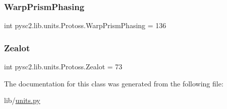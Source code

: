 \subsubsection{\texorpdfstring{Warp\+Prism\+Phasing}{WarpPrismPhasing}}
{\footnotesize\ttfamily int pysc2.\+lib.\+units.\+Protoss.\+Warp\+Prism\+Phasing = 136\hspace{0.3cm}{\ttfamily [static]}}

\mbox{\label{classpysc2_1_1lib_1_1units_1_1_protoss_a4c808c05c5d50f5057a6243f483c724e}} 
\subsubsection{\texorpdfstring{Zealot}{Zealot}}
{\footnotesize\ttfamily int pysc2.\+lib.\+units.\+Protoss.\+Zealot = 73\hspace{0.3cm}{\ttfamily [static]}}



The documentation for this class was generated from the following file\+:\begin{DoxyCompactItemize}
\item 
lib/\mbox{\hyperlink{units_8py}{units.\+py}}\end{DoxyCompactItemize}
